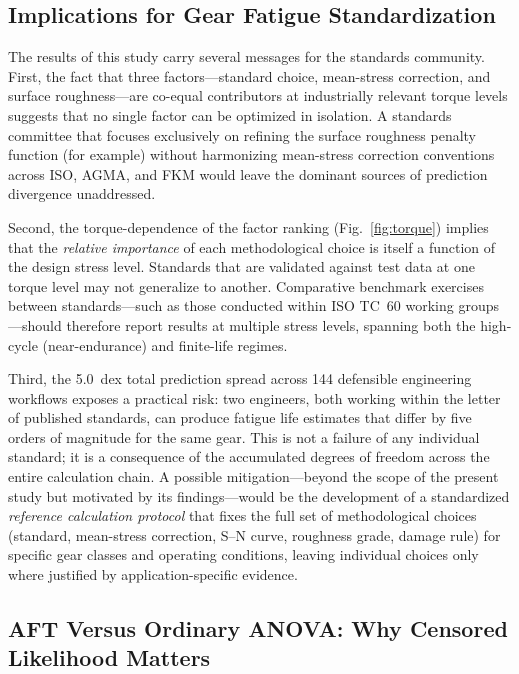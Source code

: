 \documentclass[12pt,a4paper]{article}
\begin{document}
\subsection{Implications for Gear Fatigue Standardization}

The results of this study carry several messages for the standards
community. First, the fact that three factors---standard choice,
mean-stress correction, and surface roughness---are co-equal
contributors at industrially relevant torque levels suggests that
no single factor can be optimized in isolation. A standards committee
that focuses exclusively on refining the surface roughness penalty
function (for example) without harmonizing mean-stress correction
conventions across ISO, AGMA, and FKM would leave the dominant
sources of prediction divergence unaddressed.

Second, the torque-dependence of the factor ranking
(Fig.~\ref{fig:torque}) implies that the \emph{relative importance} of
each methodological choice is itself a function of the design stress
level. Standards that are validated against test data at one torque
level may not generalize to another. Comparative benchmark exercises
between standards---such as those conducted within ISO TC~60 working
groups---should therefore report results at multiple stress levels,
spanning both the high-cycle (near-endurance) and finite-life regimes.

Third, the 5.0~dex total prediction spread across 144 defensible
engineering workflows exposes a practical risk: two engineers, both
working within the letter of published standards, can produce fatigue
life estimates that differ by five orders of magnitude for the same
gear. This is not a failure of any individual standard; it is a
consequence of the accumulated degrees of freedom across the entire
calculation chain. A possible mitigation---beyond the scope of the
present study but motivated by its findings---would be the development
of a standardized \emph{reference calculation protocol} that fixes the
full set of methodological choices (standard, mean-stress correction,
S--N curve, roughness grade, damage rule) for specific gear classes and
operating conditions, leaving individual choices only where justified
by application-specific evidence.

\subsection{AFT Versus Ordinary ANOVA: Why Censored Likelihood Matters}
\end{document}
